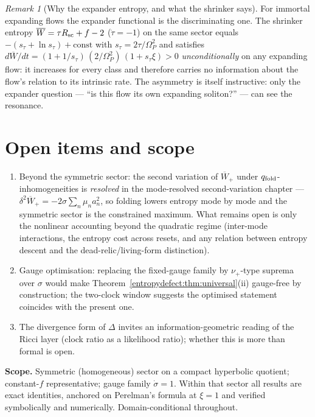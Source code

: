 \documentclass[11pt,a4paper,oneside]{book}
\newcommand{\Op}{\Omega_P}
\newcommand{\qf}{q_{\rm fold}}
\newcommand{\Wp}{\overline W_{+}}
\newcommand{\Wm}{\overline W}
\theoremstyle{plain}
\theoremstyle{definition}
\theoremstyle{remark}
\newtheorem*{remark}{Remark}
\begin{document}
\begin{remark}[Why the expander entropy, and what the shrinker says]
For immortal expanding flows the expander functional is the discriminating one. The shrinker entropy
$\Wm=\tau R_{\rm sc}+f-2$ ($\dot\tau=-1$) on the same sector equals $-(s_\tau+\ln s_\tau)+\text{const}$
with $s_\tau=2\tau/\Op^2$ and satisfies $d\Wm/dt=(1+1/s_\tau)\,(2/\Op^2)\,(1+s_\tau\xi)>0$
\emph{unconditionally} on any expanding flow: it increases for every class and therefore carries no
information about the flow's relation to its intrinsic rate. The asymmetry is itself instructive: only
the expander question --- ``is this flow its own expanding soliton?'' --- can see the resonance.
\end{remark}

\section{Open items and scope}

\begin{enumerate}[leftmargin=1.6em,itemsep=2pt]
\item Beyond the symmetric sector: the second variation of $\Wp$ under $\qf$-inhomogeneities is
\emph{resolved} in the mode-resolved second-variation chapter --- $\delta^2\Wp=-2\sigma\sum_n\mu_n a_n^2$,
so folding lowers entropy mode by mode and the symmetric sector is the constrained maximum. What remains
open is only the nonlinear accounting beyond the quadratic regime (inter-mode interactions, the entropy
cost across resets, and any relation between entropy descent and the dead-relic/living-form distinction).
\item Gauge optimisation: replacing the fixed-gauge family by $\nu_+$-type suprema over $\sigma$ would
make Theorem~\ref{entropydefect:thm:universal}(ii) gauge-free by construction; the two-clock window suggests the
optimised statement coincides with the present one.
\item The divergence form of $\Delta$ invites an information-geometric reading of the Ricci layer
(clock ratio as a likelihood ratio); whether this is more than formal is open.
\end{enumerate}

\textbf{Scope.} Symmetric (homogeneous) sector on a compact hyperbolic quotient; constant-$f$
representative; gauge family $\dot\sigma=1$. Within that sector all results are exact identities,
anchored on Perelman's formula at $\xi=1$ and verified symbolically and numerically.
Domain-conditional throughout.
\end{document}
